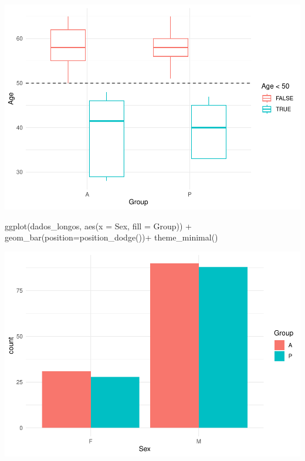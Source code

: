 \documentclass[
]{article}
\newenvironment{Shaded}{\begin{snugshade}}{\end{snugshade}}
\newcommand{\AttributeTok}[1]{\textcolor[rgb]{0.77,0.63,0.00}{#1}}
\newcommand{\FunctionTok}[1]{\textcolor[rgb]{0.00,0.00,0.00}{#1}}
\newcommand{\NormalTok}[1]{#1}
\newcommand{\SpecialCharTok}[1]{\textcolor[rgb]{0.00,0.00,0.00}{#1}}
\begin{document}
\includegraphics{EDA__files/figure-latex/unnamed-chunk-5-2.pdf}

\begin{Shaded}
\begin{Highlighting}[]
\FunctionTok{ggplot}\NormalTok{(dados\_longos, }\FunctionTok{aes}\NormalTok{(}\AttributeTok{x =}\NormalTok{ Sex, }\AttributeTok{fill =}\NormalTok{ Group)) }\SpecialCharTok{+} 
  \FunctionTok{geom\_bar}\NormalTok{(}\AttributeTok{position=}\FunctionTok{position\_dodge}\NormalTok{())}\SpecialCharTok{+}
  \FunctionTok{theme\_minimal}\NormalTok{()}
\end{Highlighting}
\end{Shaded}

\includegraphics{EDA__files/figure-latex/unnamed-chunk-5-3.pdf}
\end{document}
